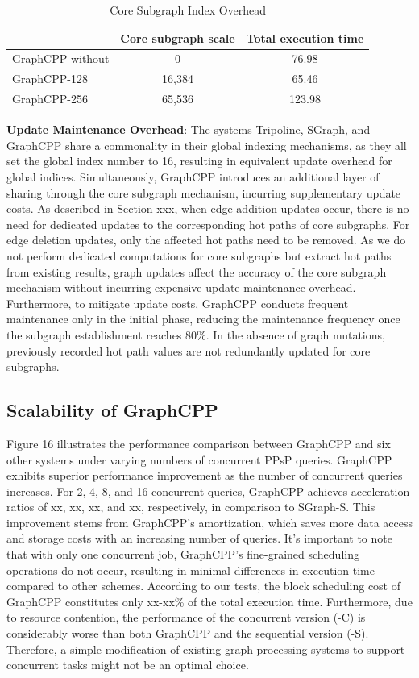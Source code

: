 \documentclass[lettersize,journal]{IEEEtran} %
\begin{document}
\begin{table}[htbp]
    \centering
    \label{tab:mytable}
    \begin{tabular}{|l|c|c|}
      \hline
      & Core subgraph scale  & Total execution time \\
      \hline
      GraphCPP-without & 0 & 76.98 \\
      GraphCPP-128 & 16,384 & 65.46 \\
      GraphCPP-256 & 65,536 & 123.98 \\
      \hline
    \end{tabular}
    \caption{Core Subgraph Index Overhead}
  \end{table}


{\bf{Update Maintenance Overhead}}: The systems Tripoline, SGraph, and GraphCPP share a commonality in their global indexing mechanisms, as they all set the global index number to 16, resulting in equivalent update overhead for global indices. Simultaneously, GraphCPP introduces an additional layer of sharing through the core subgraph mechanism, incurring supplementary update costs. As described in Section xxx, when edge addition updates occur, there is no need for dedicated updates to the corresponding hot paths of core subgraphs. For edge deletion updates, only the affected hot paths need to be removed. As we do not perform dedicated computations for core subgraphs but extract hot paths from existing results, graph updates affect the accuracy of the core subgraph mechanism without incurring expensive update maintenance overhead. Furthermore, to mitigate update costs, GraphCPP conducts frequent maintenance only in the initial phase, reducing the maintenance frequency once the subgraph establishment reaches 80\%. In the absence of graph mutations, previously recorded hot path values are not redundantly updated for core subgraphs.


\subsection{Scalability of GraphCPP}
Figure 16 illustrates the performance comparison between GraphCPP and six other systems under varying numbers of concurrent PPsP queries. GraphCPP exhibits superior performance improvement as the number of concurrent queries increases. For 2, 4, 8, and 16 concurrent queries, GraphCPP achieves acceleration ratios of xx, xx, xx, and xx, respectively, in comparison to SGraph-S. This improvement stems from GraphCPP's amortization, which saves more data access and storage costs with an increasing number of queries. It's important to note that with only one concurrent job, GraphCPP's fine-grained scheduling operations do not occur, resulting in minimal differences in execution time compared to other schemes. According to our tests, the block scheduling cost of GraphCPP constitutes only xx-xx\% of the total execution time. Furthermore, due to resource contention, the performance of the concurrent version (-C) is considerably worse than both GraphCPP and the sequential version (-S). Therefore, a simple modification of existing graph processing systems to support concurrent tasks might not be an optimal choice.
\end{document}
